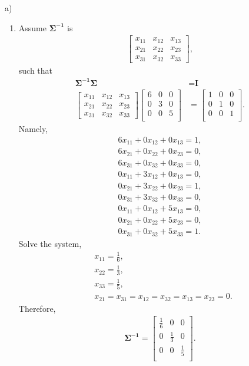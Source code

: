 \documentclass[10pt]{article}
\begin{document}
a)

\begin{enumerate}[1)]
\item
Assume $\pmb{\Sigma^{-1}}$ is
\begin{align*}
  \begin{bmatrix}
    x_{11} & x_{12} & x_{13}\\
    x_{21} & x_{22} & x_{23}\\
    x_{31} & x_{32} & x_{33}
  \end{bmatrix}
,
\end{align*}
such that
\begin{align*}
\pmb{\Sigma^{-1}}\pmb{\Sigma}&=\textbf{I}\\
  \begin{bmatrix}
    x_{11} & x_{12} & x_{13}\\
    x_{21} & x_{22} & x_{23}\\
    x_{31} & x_{32} & x_{33}
  \end{bmatrix}
  \begin{bmatrix}
    6 & 0 & 0\\
    0 & 3 & 0\\
    0 & 0 & 5\\
  \end{bmatrix}
&=
  \begin{bmatrix}
    1 & 0 & 0\\
    0 & 1 & 0\\
    0 & 0 & 1\\
  \end{bmatrix}
.
\end{align*}
Namely,
\begin{align*}
6x_{11}+0x_{12}+0x_{13}=1,\\
6x_{21}+0x_{22}+0x_{23}=0,\\
6x_{31}+0x_{32}+0x_{33}=0,\\
0x_{11}+3x_{12}+0x_{13}=0,\\
0x_{21}+3x_{22}+0x_{23}=1,\\
0x_{31}+3x_{32}+0x_{33}=0,\\
0x_{11}+0x_{12}+5x_{13}=0,\\
0x_{21}+0x_{22}+5x_{23}=0,\\
0x_{31}+0x_{32}+5x_{33}=1.
\end{align*}
Solve the system,
\begin{align*}
&x_{11}=\frac{1}{6},\\
&x_{22}=\frac{1}{3},\\
&x_{33}=\frac{1}{5},\\
&x_{21}=x_{31}=x_{12}=x_{32}=x_{13}=x_{23}=0.
\end{align*}
Therefore,
\begin{align*}
\pmb{\Sigma^{-1}}=
  \begin{bmatrix}
    \frac{1}{6} & 0 & 0\\
    0 & \frac{1}{3} & 0\\
    0 & 0 & \frac{1}{5}\\
  \end{bmatrix}
.
\end{align*}
\vspace{3mm}


\end{enumerate}
\end{document}
